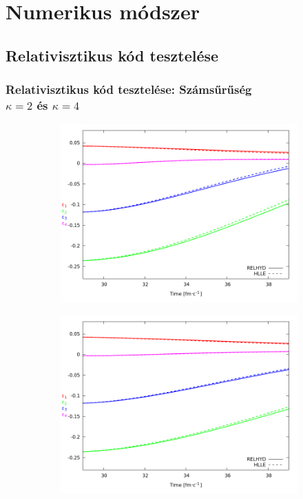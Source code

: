 \documentclass{beamer}
\begin{document}
\section{Numerikus módszer}
\subsection{Relativisztikus kód tesztelése}
\begin{frame}[noframenumbering]
\frametitle{Relativisztikus kód tesztelése: Számsűrűség \\ $\kappa=2$ és $\kappa=4$}
\begin{center}
\begin{figure}[H]
	\centering
    \begin{subfigure}[b]{0.49\textwidth}
    		\includegraphics[width=\textwidth]{pic/res/hr_n_kappa=2}
	\end{subfigure}
	\begin{subfigure}[b]{0.49\textwidth}
        	\includegraphics[width=\textwidth]{pic/res/hr_n_kappa=4}
	\end{subfigure}
\end{figure}
\end{center}
\end{frame}
\end{document}
